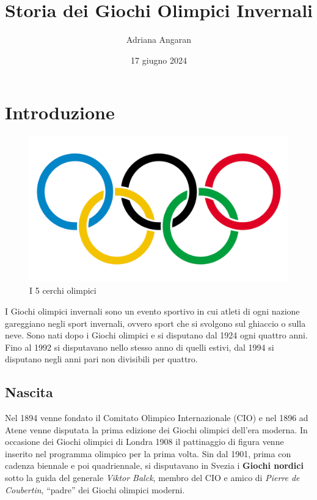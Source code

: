 \documentclass[
]{book}
\title{Storia dei Giochi Olimpici Invernali}
\author{Adriana Angaran}
\date{17 giugno 2024}
\begin{document}
\maketitle

{
\setcounter{tocdepth}{1}
\tableofcontents
}
\chapter*{Introduzione}\label{introduzione}

\begin{figure}
\includegraphics[width=0.7\linewidth]{images/cerchi} \caption{I 5 cerchi olimpici}\label{fig:unnamed-chunk-1}
\end{figure}

I Giochi olimpici invernali sono un evento sportivo in cui atleti di ogni nazione gareggiano negli sport invernali, ovvero sport che si svolgono sul ghiaccio o sulla neve.
Sono nati dopo i Giochi olimpici e si disputano dal 1924 ogni quattro anni. Fino al 1992 si disputavano nello stesso anno di quelli estivi, dal 1994 si disputano negli anni pari non divisibili per quattro.

\section*{Nascita}\label{nascita}

Nel 1894 venne fondato il Comitato Olimpico Internazionale (CIO) e nel 1896 ad Atene venne disputata la prima edizione dei Giochi olimpici dell'era moderna.
In occasione dei Giochi olimpici di Londra 1908 il pattinaggio di figura venne inserito nel programma olimpico per la prima volta.
Sin dal 1901, prima con cadenza biennale e poi quadriennale, si disputavano in Svezia i \textbf{Giochi nordici} sotto la guida del generale \emph{Viktor Balck}, membro del CIO e amico di \emph{Pierre de Coubertin}, ``padre'' dei Giochi olimpici moderni.
\end{document}
